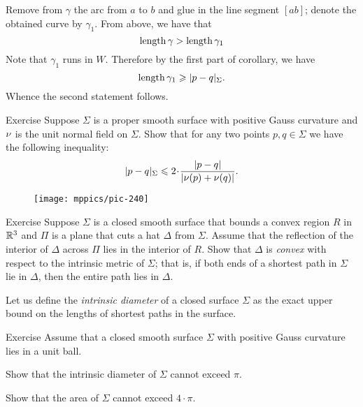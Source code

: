 Remove from $\gamma$ the arc from $a$ to $b$ and glue in the line segment $[ab]$;
denote the obtained curve by $\gamma_1$. 
From above, we have that
\[\mathop{\rm length}\nolimits\gamma>\mathop{\rm length}\nolimits \gamma_1\]
Note that $\gamma_1$ runs in $W$.
Therefore by the first part of corollary, we have
\[\mathop{\rm length}\nolimits \gamma_1\geqslant |p-q|_\Sigma.\]
Whence the second statement follows.
\qeds

\begin{thm}{Exercise}\label{ex:length-dist}
Suppose $\Sigma$ is a proper smooth surface with positive Gauss curvature and $\nu$ is the unit normal field on $\Sigma$.
Show that for any two points $p,q\in \Sigma$ we have the following inequality:
\[|p-q|_\Sigma\le 2\cdot \frac{|p-q|}{|\Norm(p)+\Norm(q)|}.\]

\end{thm}


\begin{wrapfigure}{r}{27 mm}
\vskip-0mm
\centering
\texttt{[image: mppics/pic-240]}
\end{wrapfigure}

\begin{thm}{Exercise}\label{ex:hat-convex}
Suppose $\Sigma$ is a closed smooth surface that bounds a convex region $R$ 
in $\mathbb{R}^3$
and $\Pi$ is a plane that cuts a hat $\Delta$ from $\Sigma$.
Assume that the reflection of the interior of $\Delta$ across $\Pi$ lies in the interior of $R$.
Show that $\Delta$ is \emph{convex} with respect to the intrinsic metric  of $\Sigma$;
that is, 
if both ends of a shortest path in $\Sigma$ 
lie in $\Delta$,
then the entire path lies in $\Delta$.
\end{thm}


Let us define the \emph{intrinsic diameter} of a closed surface $\Sigma$ as the exact upper bound on the lengths of shortest paths in the surface.

\begin{thm}{Exercise}\label{ex:intrinsic-diameter}
Assume that a closed smooth surface $\Sigma$ with positive Gauss curvature lies in a unit ball.

\begin{subthm}{} Show that the intrinsic diameter of $\Sigma$ cannot exceed $\pi$.
 
\end{subthm}

\begin{subthm}{}
Show that the area of $\Sigma$ cannot exceed $4\cdot \pi$.
\end{subthm}

\end{thm}

